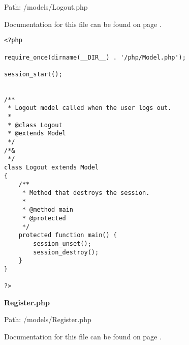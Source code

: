 Path: /models/Logout.php

Documentation for this file can be found on page \pageref{Logout.php.doc}.

{\scriptsize
\begin{lstlisting}
<?php

require_once(dirname(__DIR__) . '/php/Model.php');

session_start();


/**
 * Logout model called when the user logs out.
 *
 * @class Logout
 * @extends Model
 */
/*&
 */
class Logout extends Model
{
	/**
	 * Method that destroys the session.
	 *
	 * @method main
	 * @protected
	 */
	protected function main() {
		session_unset();
		session_destroy();
	}
}

?>\end{lstlisting}
}
\textbf{Register.php}\label{Register.php}

Path: /models/Register.php

Documentation for this file can be found on page \pageref{Register.php.doc}.

